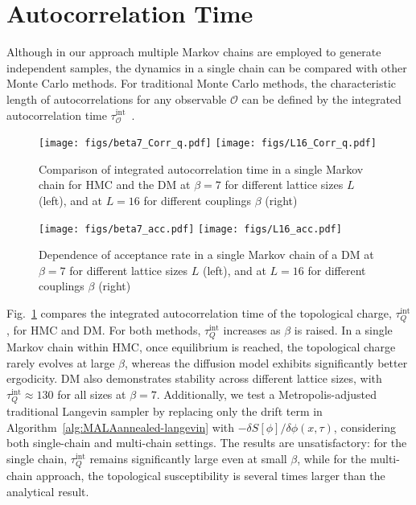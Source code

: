 \documentclass[a4paper,11pt]{article}
\begin{document}
\section{Autocorrelation Time}
\label{app:acc}


Although in our approach multiple Markov chains are employed to generate independent samples, the dynamics in a single chain can be compared with other Monte Carlo methods. For traditional Monte Carlo methods, the characteristic length of autocorrelations for any observable $\mathcal{O}$ can be defined by the integrated autocorrelation time $\tau^\mathrm{int}_\mathcal{O}$~\cite{Madras:1988ei}. 


\begin{figure}[hbpt!]
\centering
\texttt{[image: figs/beta7\_Corr\_q.pdf]}
\texttt{[image: figs/L16\_Corr\_q.pdf]}
\caption{
    Comparison of integrated autocorrelation time in a single Markov chain for HMC and the DM at $\beta=7$ for different lattice sizes $L$ (left), and at $L=16$ for different couplings $\beta$ (right) 
}
\label{fig:corr}
\end{figure}


\begin{figure}[h]
\centering
\texttt{[image: figs/beta7\_acc.pdf]}
\texttt{[image: figs/L16\_acc.pdf]}
\caption{
    Dependence of acceptance rate in a single Markov chain of a DM at $\beta=7$ for different lattice sizes $L$ (left), and at $L=16$ for different couplings $\beta$ (right) 
}
\label{fig:acc}
\end{figure}

Fig.~\ref{fig:corr} compares the integrated autocorrelation time of the topological charge, $\tau^\mathrm{int}_Q$, for HMC and DM. For both methods, $\tau^\mathrm{int}_Q$ increases as $\beta$ is raised. In a single Markov chain within HMC, once equilibrium is reached, the topological charge rarely evolves at large $\beta$, whereas the diffusion model exhibits significantly better ergodicity. DM also demonstrates stability across different lattice sizes, with $\tau^\mathrm{int}_Q \approx 130$ for all sizes at $\beta=7$. Additionally, we test a Metropolis-adjusted traditional Langevin sampler by replacing only the drift term in Algorithm~\ref{alg:MALAannealed-langevin} with $ -\delta S[\phi]/\delta \phi(x,\tau)$, considering both single-chain and multi-chain settings. The results are unsatisfactory: for the single chain, $\tau^\mathrm{int}_Q$ remains significantly large even at small $\beta$, while for the multi-chain approach, the topological susceptibility is several times larger than the analytical result.
\end{document}
